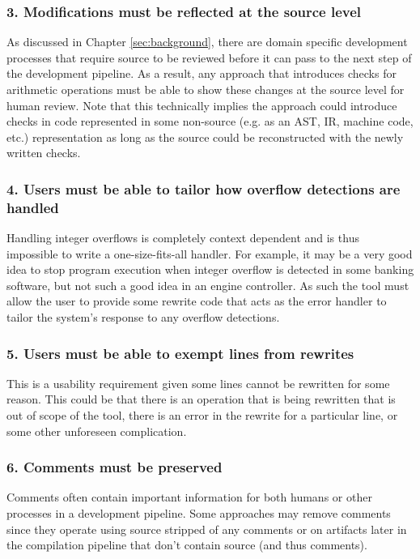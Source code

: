 \subsubsection{3. Modifications must be reflected at the source level}

As discussed in Chapter \ref{sec:background}, there are domain specific development processes that require source to be reviewed before it can pass to the next step of the development pipeline. As a result, any approach that introduces checks for arithmetic operations must be able to show these changes at the source level for human review. Note that this technically implies the approach could introduce checks in code represented in some non-source (e.g. as an AST, IR, machine code, etc.) representation as long as the source could be reconstructed with the newly written checks.

\subsubsection{4. Users must be able to tailor how overflow detections are handled}

Handling integer overflows is completely context dependent and is thus impossible to write a one-size-fits-all handler. For example, it may be a very good idea to stop program execution when integer overflow is detected in some banking software, but not such a good idea in an engine controller. As such the tool must allow the user to provide some rewrite code that acts as the error handler to tailor the system's response to any overflow detections.

\subsubsection{5. Users must be able to exempt lines from rewrites }

This is a usability requirement given some lines cannot be rewritten for some reason. This could be that there is an operation that is being rewritten that is out of scope of the tool, there is an error in the rewrite for a particular line, or some other unforeseen complication.

\subsubsection{6. Comments must be preserved}

Comments often contain important information for both humans or other processes in a development pipeline. Some approaches may remove comments since they operate using source stripped of any comments or on artifacts later in the compilation pipeline that don't contain source (and thus comments).

